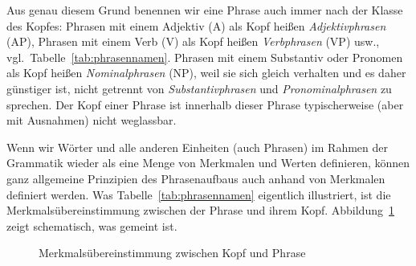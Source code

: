 Aus genau diesem Grund benennen wir eine Phrase auch immer nach der Klasse des Kopfes:
Phrasen mit einem Adjektiv (A) als Kopf heißen \textit{Adjektivphrasen} (AP), Phrasen mit einem Verb (V) als Kopf heißen \textit{Verbphrasen} (VP) usw., vgl.\ Tabelle~\ref{tab:phrasennamen}.
Phrasen mit einem Substantiv oder Pronomen als Kopf heißen \textit{Nominalphrasen} (NP), weil sie sich gleich verhalten und es daher günstiger ist, nicht getrennt von \textit{Substantivphrasen} und \textit{Pronominalphrasen} zu sprechen. 
Der Kopf einer Phrase ist innerhalb dieser Phrase typischerweise (aber mit Ausnahmen) nicht weglassbar.\label{abs:kopfnichtweglassbar}

\begin{table}[!htbp]
  \caption{Phrasenbezeichnungen nach ihren Köpfen}
  \label{tab:phrasennamen}
\end{table}

Wenn wir Wörter und alle anderen Einheiten (auch Phrasen) im Rahmen der Grammatik wieder als eine Menge von Merkmalen und Werten definieren, können ganz allgemeine Prinzipien des Phrasenaufbaus auch anhand von Merkmalen definiert werden.
Was Tabelle~\ref{tab:phrasennamen} eigentlich illustriert, ist die Merkmalsübereinstimmung zwischen der Phrase und ihrem Kopf.
Abbildung~\ref{fig:hfp} zeigt schematisch, was gemeint ist.

\begin{figure}[!htbp]
  \centering
  \caption{Merkmalsübereinstimmung zwischen Kopf und Phrase}
  \label{fig:hfp}
\end{figure}

